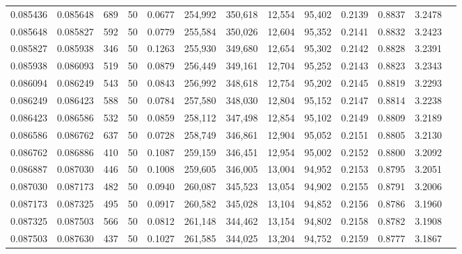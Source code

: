 \begin{tabular}{rrrrrrrrrrrrr}
0.085436 & 0.085648 &   689 &  50 &                                     0.0677 & 254,992 & 350,618 &  12,554 &  95,402 & 0.2139 & 0.8837 & 3.2478 \\
0.085648 & 0.085827 &   592 &  50 &                                     0.0779 & 255,584 & 350,026 &  12,604 &  95,352 & 0.2141 & 0.8832 & 3.2423 \\
0.085827 & 0.085938 &   346 &  50 &                                     0.1263 & 255,930 & 349,680 &  12,654 &  95,302 & 0.2142 & 0.8828 & 3.2391 \\
0.085938 & 0.086093 &   519 &  50 &                                     0.0879 & 256,449 & 349,161 &  12,704 &  95,252 & 0.2143 & 0.8823 & 3.2343 \\
0.086094 & 0.086249 &   543 &  50 &                                     0.0843 & 256,992 & 348,618 &  12,754 &  95,202 & 0.2145 & 0.8819 & 3.2293 \\
0.086249 & 0.086423 &   588 &  50 &                                     0.0784 & 257,580 & 348,030 &  12,804 &  95,152 & 0.2147 & 0.8814 & 3.2238 \\
0.086423 & 0.086586 &   532 &  50 &                                     0.0859 & 258,112 & 347,498 &  12,854 &  95,102 & 0.2149 & 0.8809 & 3.2189 \\
0.086586 & 0.086762 &   637 &  50 &                                     0.0728 & 258,749 & 346,861 &  12,904 &  95,052 & 0.2151 & 0.8805 & 3.2130 \\
0.086762 & 0.086886 &   410 &  50 &                                     0.1087 & 259,159 & 346,451 &  12,954 &  95,002 & 0.2152 & 0.8800 & 3.2092 \\
0.086887 & 0.087030 &   446 &  50 &                                     0.1008 & 259,605 & 346,005 &  13,004 &  94,952 & 0.2153 & 0.8795 & 3.2051 \\
0.087030 & 0.087173 &   482 &  50 &                                     0.0940 & 260,087 & 345,523 &  13,054 &  94,902 & 0.2155 & 0.8791 & 3.2006 \\
0.087173 & 0.087325 &   495 &  50 &                                     0.0917 & 260,582 & 345,028 &  13,104 &  94,852 & 0.2156 & 0.8786 & 3.1960 \\
0.087325 & 0.087503 &   566 &  50 &                                     0.0812 & 261,148 & 344,462 &  13,154 &  94,802 & 0.2158 & 0.8782 & 3.1908 \\
0.087503 & 0.087630 &   437 &  50 &                                     0.1027 & 261,585 & 344,025 &  13,204 &  94,752 & 0.2159 & 0.8777 & 3.1867 \\

\end{tabular}
